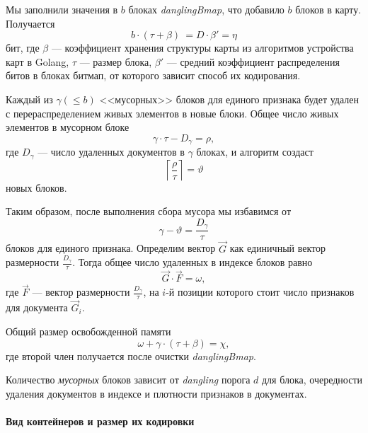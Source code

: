Мы заполнили значения в $b$ блоках \textit{danglingBmap}, что добавило $b$ блоков в карту.
Получается 
\begin{equation}
    \label{eta}
    b \cdot (\tau + \beta) ~= D \cdot \beta' = \eta
\end{equation}
бит, где $\beta$ — коэффициент хранения структуры карты из алгоритмов устройства
карт в Golang, $\tau$ — размер блока, $\beta'$ —  средний коэффициент
распределения битов в блоках битмап, от которого зависит способ их кодирования.

Каждый из $\gamma (\leq b)$ <<мусорных>> блоков для единого признака будет удален с перераспределением живых
элементов в новые блоки. Общее число живых элементов в мусорном блоке 
\begin{equation}
    \gamma \cdot \tau - D_{\gamma} = \rho,
\end{equation}
где $D_{\gamma}$ — число удаленных документов в $\gamma$ блоках, и алгоритм создаст
\begin{equation}
    \left\lceil \frac{\rho}{\tau}\right\rceil = \vartheta 
\end{equation}
новых блоков.

Таким образом, после выполнения сбора мусора мы избавимся от 
\begin{equation}
    \gamma - \vartheta = \frac{D_{\gamma}}{\tau}
\end{equation}
блоков для единого признака. Определим вектор $\vec{G}$ как единичный вектор
размерности $\frac{D_{\gamma}}{\tau}$. Тогда общее число удаленных в индексе блоков равно
\begin{equation}
    \vec{G} \cdot \vec{F} = \omega,
\end{equation}
где $\vec{F}$ — вектор размерности $\frac{D_{\gamma}}{\tau}$, на $i$-й позиции которого
стоит число признаков для документа $\vec{G}_i$.

Общий размер освобожденной памяти
\begin{equation}
    \omega + \gamma \cdot \left(\tau + \beta\right) = \chi,
\end{equation}
где второй член получается после очистки \textit{danglingBmap}.

Количество \textit{мусорных} блоков зависит от \textit{dangling} порога $d$ для
блока, очередности удаления документов в индексе и плотности признаков в
документах.

\paragraph{Вид контейнеров и размер их кодировки}

